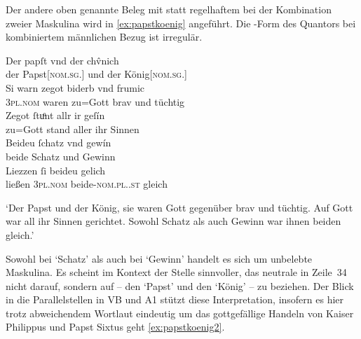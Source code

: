 Der andere oben genannte Beleg mit  statt regelhaftem 
bei der Kombination zweier Maskulina wird in \cref{ex:papstkoenig} angeführt.
Die -Form des Quantors bei kombiniertem männlichen Bezug ist
irregulär. %

\begin{exe}
\ex\label{ex:papstkoenig} %
	\gll Der papſt vnd der chv̂nich \\
		der Papst[\textsc{nom.sg.\MascM}] und der König[\textsc{nom.sg.\MascM}] \\
\sn \gll Si warn zegot biderb vnd frumic \\
		\textsc{3pl\subM.nom} waren {zu=Gott} brav und tüchtig \\
\sn \gll Zegot ſtuͦnt allr ir geſín \\
		{zu=Gott} stand aller ihr Sinnen \\
\sn \gll Beideu ſchatz vnd gewín \\
		beide Schatz und Gewinn \\
\sn \gll Liezzen ſi beideu gelich \\
		ließen \textsc{3pl\subM.nom} beide-\textsc{nom.pl.\NeutM.st} gleich \\
	\begin{taggedline}{\parencites[\pno~17vb,30--34]{kc:B1}[vgl. abweichend][6110--6113]{schroeder1895}}
	\trans `Der Papst und der König, sie waren Gott gegenüber brav und
		tüchtig. Auf Gott war all ihr Sinnen gerichtet. Sowohl Schatz als auch
		Gewinn war ihnen beiden gleich.'
	\end{taggedline}
\end{exe}

Sowohl bei  `Schatz' als auch bei  `Gewinn'
handelt es sich um unbelebte Maskulina. Es scheint im Kontext der Stelle
sinnvoller, das neutrale  in Zeile~34 nicht darauf, sondern auf
 -- den  `Papst' und den  `König' --
zu beziehen. Der Blick in die Parallelstellen in VB und
A1 stützt diese Interpretation, insofern es hier trotz abweichendem
Wortlaut eindeutig um das gottgefällige Handeln von Kaiser Philippus und Papst
Sixtus geht \cref{ex:papstkoenig2}.

